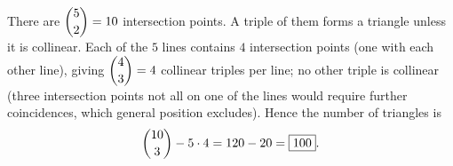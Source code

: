 There are $\dbinom52=10$ intersection points. A triple of them forms a triangle unless it is collinear. Each of the $5$ lines contains $4$ intersection points (one with each other line), giving $\dbinom43=4$ collinear triples per line; no other triple is collinear (three intersection points not all on one of the lines would require further coincidences, which general position excludes). Hence the number of triangles is
\[\dbinom{10}{3}-5\cdot4=120-20=\boxed{100}.\]
